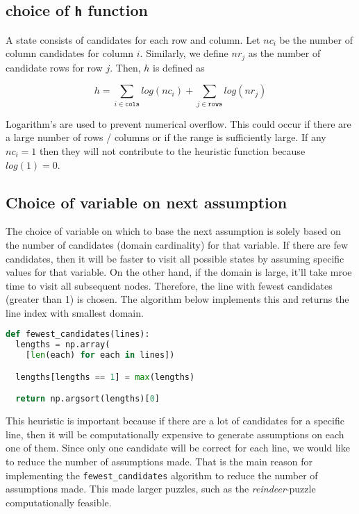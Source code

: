 \subsection*{choice of \texttt{h} function}
A state consists of candidates for each row and column. Let $nc_i$ be the
number of column candidates for column $i$. Similarly, we define $nr_j$ as the
number of candidate rows for row $j$. Then, $h$ is defined as

\begin{displaymath}
  h = \sum\limits_{i \in \texttt{cols}} log(nc_i) + \sum\limits_{j \in \texttt{rows}} log(nr_j)
\end{displaymath}

Logarithm's are used to prevent numerical overflow. This could occur if there
are a large number of rows / columns or if the range is sufficiently large. If any
$nc_i = 1$ then they will not contribute to the heuristic function because $log(1) = 0$.

\subsection*{Choice of variable on next assumption}
The choice of variable on which to base the next assumption is solely based
on the number of candidates (domain cardinality) for that variable. If there
are few candidates, then it will be faster to visit all possible states by
assuming specific values for that variable. On the other hand, if the domain
is large, it'll take mroe time to visit all subsequent nodes. Therefore, the
line with fewest candidates (greater than 1) is chosen. The algorithm below
implements this and returns the line index with smallest domain.

\begin{algorithm}
\begin{footnotesize}
\begin{lstlisting}[language=Python, caption=Algorithm used to find the row / column with smallest domain.]
def fewest_candidates(lines):
  lengths = np.array(
    [len(each) for each in lines])

  lengths[lengths == 1] = max(lengths)

  return np.argsort(lengths)[0]
\end{lstlisting}
\end{footnotesize}
\end{algorithm}

This heuristic is important because if there are a lot of candidates for a specific line,
then it will be computationally expensive to generate assumptions on each one of them.
Since only one candidate will be correct for each line, we would like to reduce the number
of assumptions made. That is the main reason for implementing the \texttt{fewest\_candidates}
algorithm to reduce the number of assumptions made. This made larger puzzles, such as
the \textit{reindeer}-puzzle computationally feasible.
